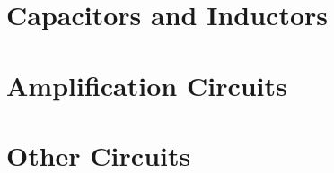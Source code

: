 \documentclass{book}
\begin{document}
\part{Capacitors and Inductors}





\part{Amplification Circuits}


\part{Other Circuits}

% 

\appendix







\end{document}
